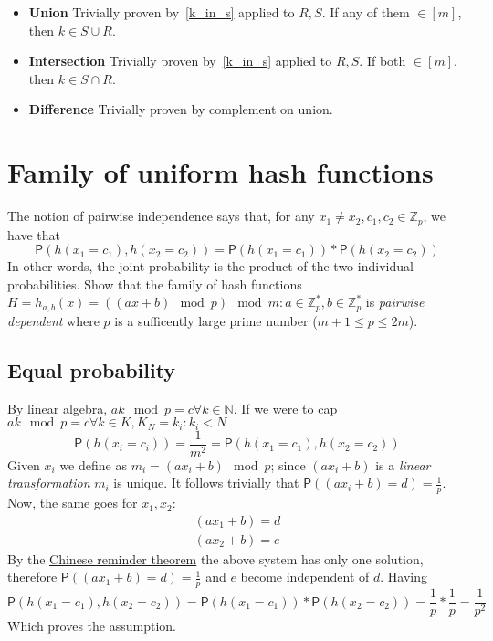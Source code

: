 \documentclass{article}
\newcommand*{\prob}{\mathsf{P}}     %
\begin{document}
\begin{itemize}
    \item \textbf{Union} Trivially proven by~\ref{k_in_s} applied to $R, S$.
    If any of them $\in [m]$, then $k \in S \cup R$.
    \item \textbf{Intersection} Trivially proven by~\ref{k_in_s} applied to $R, S$.
    If both $\in [m]$, then $k \in S \cap R$.
    \item \textbf{Difference} Trivially proven by complement on union.
\end{itemize}


\newpage
\section{Family of uniform hash functions}

The notion of pairwise independence says that, for any $x_{1} \neq x_{2}, c_{1}, c_{2}
\in \mathbb{Z}_{p}$, we have that
    \begin{equation}
    \prob(h(x_{1} = c_{1}), h(x_{2} = c_{2})) = \prob(h(x_{1} = c_{1})) * \prob(h(x_{2} = c_{2}))
    \end{equation}
In other words, the joint probability is the product of the two individual probabilities.
Show that the family of hash functions $H = {h_{a,b}(x) = ((ax + b) \mod p) \mod m}:
a \in \mathbb{Z}^{*}_{p},
b \in \mathbb{Z}^{*}_{p}$ is \emph{pairwise dependent}
where $p$ is a sufficently large prime number ($m + 1 \leq p \leq 2m$).

\subsection{Equal probability}

By linear algebra, $ak \mod p = c \forall k \in \mathbb{N}$.
If we were to cap $ak \mod p = c \forall k \in K, K_{N} = {k_{i}: k_{i} < N}$
\begin{equation}
\prob(h(x_{i} = c_{i})) = \frac{1}{m^{2}} = \prob(h(x_{1} = c_{1}), h(x_{2} = c_{2}))
\end{equation}
Given $x_{i}$ we define as $m_{i} = (a x_{i} + b) \mod p$; since $(a x_{i} + b)$
is a \emph{linear transformation} $m_{i}$ is unique.
It follows trivially that $\prob((a x_{i} + b) = d) = \frac{1}{p}$.
Now, the same goes for $x_{1}, x_{2}$:
    \begin{gather}
    (a x_{1} + b) = d                                                           \\
    (a x_{2} + b) = e
    \end{gather}
By the \href{http://en.wikipedia.org/wiki/Chinese_remainder_theorem}{Chinese reminder theorem}
the above system has only one solution, therefore $\prob((a x_{1} + b) = d) = \frac{1}{p}$ and
$e$ become independent of $d$.
Having
\begin{equation}
    \prob(h(x_{1} = c_{1}), h(x_{2} = c_{2})) =
    \prob(h(x_{1} = c_{1})) * \prob(h(x_{2} = c_{2})) =\frac{1}{p} * \frac{1}{p} = \frac{1}{p^{2}}
\end{equation}
Which proves the assumption.
\end{document}
